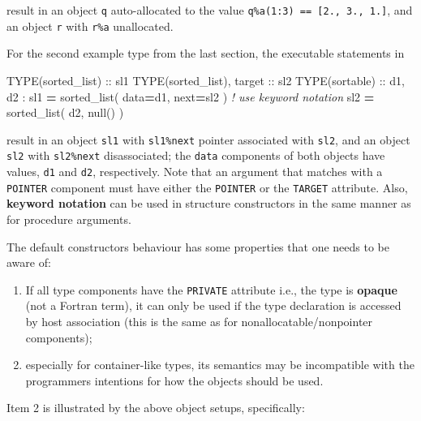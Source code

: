 \documentclass[]{scrartcl}
\newenvironment{Shaded}{}{}
\newcommand{\CommentTok}[1]{\textcolor[rgb]{0.38,0.63,0.69}{\textit{#1}}}
\newcommand{\DataTypeTok}[1]{\textcolor[rgb]{0.56,0.13,0.00}{#1}}
\newcommand{\KeywordTok}[1]{\textcolor[rgb]{0.00,0.44,0.13}{\textbf{#1}}}
\newcommand{\NormalTok}[1]{#1}
\providecommand{\tightlist}{%
  \setlength{\itemsep}{0pt}\setlength{\parskip}{0pt}}
\begin{document}
result in an object \texttt{q} auto-allocated to the value
\texttt{q\%a(1:3)\ ==\ {[}2.,\ 3.,\ 1.{]}}, and an object \texttt{r}
with \texttt{r\%a} unallocated.

For the second example type from the last section, the executable
statements in

\begin{Shaded}
\begin{Highlighting}[]
\DataTypeTok{TYPE(sorted\_list)} \DataTypeTok{::}\NormalTok{ sl1}
\DataTypeTok{TYPE(sorted\_list)}\NormalTok{, }\DataTypeTok{target} \DataTypeTok{::}\NormalTok{ sl2}
\DataTypeTok{TYPE(sortable)} \DataTypeTok{::}\NormalTok{ d1, d2}
\NormalTok{:}
\NormalTok{sl1 }\KeywordTok{=}\NormalTok{ sorted\_list( data}\KeywordTok{=}\NormalTok{d1, next}\KeywordTok{=}\NormalTok{sl2 )  }\CommentTok{! use keyword notation}
\NormalTok{sl2 }\KeywordTok{=}\NormalTok{ sorted\_list( d2, null() )}
\end{Highlighting}
\end{Shaded}

result in an object \texttt{sl1} with \texttt{sl1\%next} pointer
associated with \texttt{sl2}, and an object \texttt{sl2} with
\texttt{sl2\%next} disassociated; the \texttt{data} components of both
objects have values, \texttt{d1} and \texttt{d2}, respectively. Note
that an argument that matches with a \texttt{POINTER} component must
have either the \texttt{POINTER} or the \texttt{TARGET} attribute. Also,
\textbf{keyword notation} can be used in structure constructors in the
same manner as for procedure arguments.

The default constructor\textquotesingle s behaviour has some properties
that one needs to be aware of:

\begin{enumerate}
\def\labelenumi{\arabic{enumi}.}
\tightlist
\item
  If all type components have the \texttt{PRIVATE} attribute i.e., the
  type is \textbf{opaque} (not a Fortran term), it can only be used if
  the type declaration is accessed by host association (this is the same
  as for nonallocatable/nonpointer components);
\item
  especially for container-like types, its semantics may be incompatible
  with the programmers intentions for how the objects should be used.
\end{enumerate}

Item 2 is illustrated by the above object setups, specifically:
\end{document}
